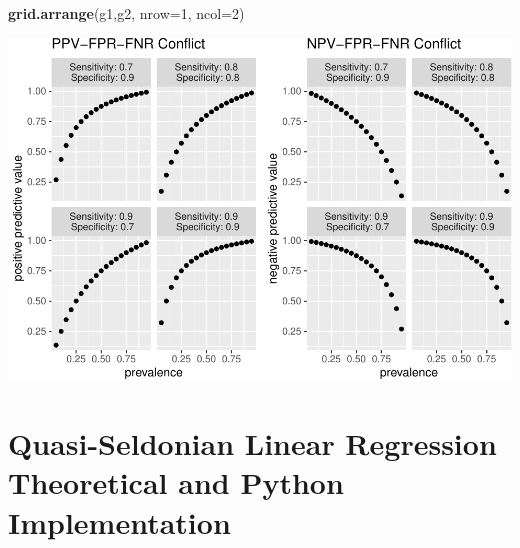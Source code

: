 \documentclass[12pt, twoside]{amherstthesis}
\newenvironment{Shaded}{\begin{snugshade}}{\end{snugshade}}
\newcommand{\AttributeTok}[1]{\textcolor[rgb]{0.13,0.29,0.53}{#1}}
\newcommand{\DecValTok}[1]{\textcolor[rgb]{0.00,0.00,0.81}{#1}}
\newcommand{\FunctionTok}[1]{\textcolor[rgb]{0.13,0.29,0.53}{\textbf{#1}}}
\newcommand{\NormalTok}[1]{#1}
\begin{document}
\begin{Shaded}
\begin{Highlighting}[]
\FunctionTok{grid.arrange}\NormalTok{(g1,g2, }\AttributeTok{nrow=}\DecValTok{1}\NormalTok{, }\AttributeTok{ncol=}\DecValTok{2}\NormalTok{)}
\end{Highlighting}
\end{Shaded}
\begin{center}\includegraphics{Dasha-Asienga_StatThesis_files/figure-latex/unnamed-chunk-51-1} \end{center}

\hypertarget{appendix-b}{%
\chapter{Quasi-Seldonian Linear Regression Theoretical and Python Implementation}\label{appendix-b}}
\end{document}

